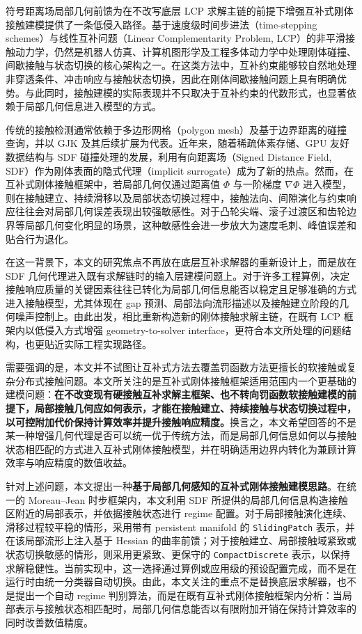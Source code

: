 符号距离场局部几何前馈为在不改写底层 LCP 求解主链的前提下增强互补式刚体接触建模提供了一条低侵入路径。基于速度级时间步进法（time-stepping schemes）与线性互补问题（Linear Complementarity Problem, LCP）的非平滑接触动力学，仍然是机器人仿真、计算机图形学及工程多体动力学中处理刚体碰撞、间歇接触与状态切换的核心架构之一\cite{flores2022contact,wang2021nonsmooth,stewart1996implicit,anitescu1997formulating}。在这类方法中，互补约束能够较自然地处理非穿透条件、冲击响应与接触状态切换，因此在刚体间歇接触问题上具有明确优势。与此同时，接触建模的实际表现并不只取决于互补约束的代数形式，也显著依赖于局部几何信息进入模型的方式。

传统的接触检测通常依赖于多边形网格（polygon mesh）及基于边界距离的碰撞查询，并以 GJK 及其后续扩展为代表\cite{gilbert1988fast,wang2021collision}。近年来，随着稀疏体素存储、GPU 友好数据结构与 SDF 碰撞处理的发展，利用有向距离场（Signed Distance Field, SDF）作为刚体表面的隐式代理（implicit surrogate）成为了新的热点\cite{museth2021nanovdb,macklin2020sdfcollision,liu2024sdfsdf,lai2024unifying,lopez2024convexsdf}。然而，在互补式刚体接触框架中，若局部几何仅通过距离值 $\Phi$ 与一阶梯度 $\nabla \Phi$ 进入模型，则在接触建立、持续滑移以及局部状态切换过程中，接触法向、间隙演化与约束响应往往会对局部几何误差表现出较强敏感性。对于凸轮尖端、滚子过渡区和齿轮边界等局部几何变化明显的场景，这种敏感性会进一步放大为速度毛刺、峰值误差和贴合行为退化。

在这一背景下，本文的研究焦点不再放在底层互补求解器的重新设计上，而是放在 SDF 几何代理进入既有求解链时的输入层建模问题上。对于许多工程算例，决定接触响应质量的关键因素往往已转化为局部几何信息能否以稳定且足够准确的方式进入接触模型，尤其体现在 gap 预测、局部法向流形描述以及接触建立阶段的几何噪声控制上。由此出发，相比重新构造新的刚体接触求解主链，在既有 LCP 框架内以低侵入方式增强 geometry-to-solver interface，更符合本文所处理的问题结构，也更贴近实际工程实现路径。

需要强调的是，本文并不试图让互补式方法去覆盖罚函数方法更擅长的软接触或复杂分布式接触问题。本文所关注的是互补式刚体接触框架适用范围内一个更基础的建模问题：\textbf{在不改变现有硬接触互补求解主框架、也不转向罚函数软接触建模的前提下，局部接触几何应如何表示，才能在接触建立、持续接触与状态切换过程中，以可控附加代价保持计算效率并提升接触响应精度。}换言之，本文希望回答的不是某一种增强几何代理是否可以统一优于传统方法，而是局部几何信息如何以与接触状态相匹配的方式进入互补式刚体接触模型，并在明确适用边界内转化为兼顾计算效率与响应精度的数值收益。

针对上述问题，本文提出一种\textbf{基于局部几何感知的互补式刚体接触建模思路}。在统一的 Moreau--Jean 时步框架内，本文利用 SDF 所提供的局部几何信息构造接触区附近的局部表示，并依据接触状态进行 regime 配置。对于局部接触演化连续、滑移过程较平稳的情形，采用带有 persistent manifold 的 \texttt{SlidingPatch} 表示，并在该局部流形上注入基于 Hessian 的曲率前馈；对于接触建立、局部接触域紧致或状态切换敏感的情形，则采用更紧致、更保守的 \texttt{CompactDiscrete} 表示，以保持求解稳健性。当前实现中，这一选择通过算例或应用级的预设配置完成，而不是在运行时由统一分类器自动切换。由此，本文关注的重点不是替换底层求解器，也不是提出一个自动 regime 判别算法，而是在既有互补式刚体接触框架内分析：当局部表示与接触状态相匹配时，局部几何信息能否以有限附加开销在保持计算效率的同时改善数值精度。

